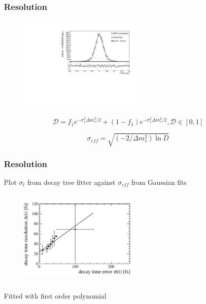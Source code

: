 \documentclass[]{beamer}
\begin{document}
\begin{frame}
\frametitle{Resolution}


\begin{figure}
\includegraphics[width=6.0cm,height=4.7cm]{plots/SignalMC_19to24.pdf}
\end{figure}

\[\mathcal{D} = f_{1}e^{-\sigma_{1}^{2}\Delta m_{s}^{2}/2} + (1-f_{1})e^{-\sigma_{1}^{2}\Delta m_{s}^{2}/2}, \mathcal{D}\in [0,1]\] 

\[\sigma_{eff} = \sqrt{(-2/\Delta m_{s}^{2}) \ln{D}}\]

\end{frame}


\begin{frame}
\frametitle{Resolution}

Plot $\sigma_{t}$ from decay tree fitter against $\sigma_{eff}$ from Gaussian fits 

\begin{figure}
\includegraphics[width=6.0cm,height=4.7cm]{plots/ProperTimeReso_MC_onlyDsKpipi.pdf}
\end{figure}

Fitted with first order polynomial 

\end{frame}
\end{document}
